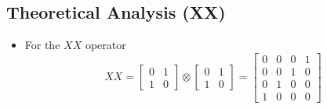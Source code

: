 \documentclass{article}
\begin{document}
\subsection{Theoretical Analysis (XX)}
\begin{itemize}
	\item For the \(XX\) operator
	      \begin{equation*}
		      XX =
		      \begin{bmatrix}
			      0 & 1 \\
			      1 & 0
		      \end{bmatrix}
		      \otimes
		      \begin{bmatrix}
			      0 & 1 \\
			      1 & 0
		      \end{bmatrix}
		      = \begin{bmatrix}
			      0 & 0 & 0 & 1 \\
			      0 & 0 & 1 & 0 \\
			      0 & 1 & 0 & 0 \\
			      1 & 0 & 0 & 0
		      \end{bmatrix}
	      \end{equation*}
	

\end{itemize}
\end{document}
